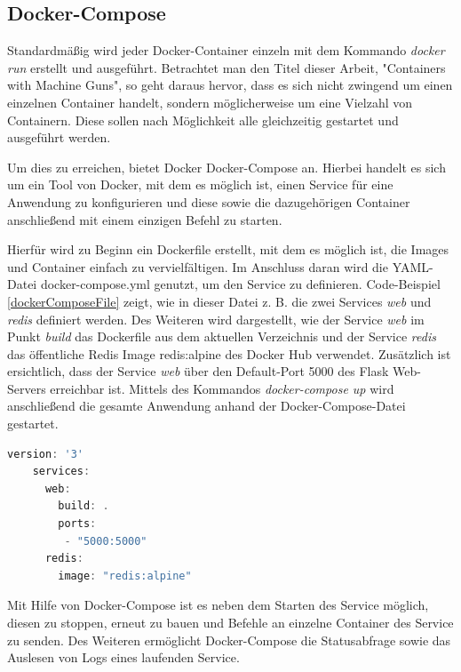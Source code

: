 \subsection{Docker-Compose}
\label{ss:dockerCompose}

Standardmäßig wird jeder Docker-Container einzeln mit dem Kommando \textit{docker run} erstellt und ausgeführt.
Betrachtet man den Titel dieser Arbeit, "Containers with Machine Guns", so geht daraus hervor, dass es sich nicht zwingend um einen einzelnen Container handelt, sondern möglicherweise um eine Vielzahl von Containern.
Diese sollen nach Möglichkeit alle gleichzeitig gestartet und ausgeführt werden.

Um dies zu erreichen, bietet Docker Docker-Compose an.
Hierbei handelt es sich um ein Tool von Docker, mit dem es möglich ist, einen Service für eine Anwendung zu konfigurieren und diese sowie die dazugehörigen Container anschließend mit einem einzigen Befehl zu starten.

Hierfür wird zu Beginn ein Dockerfile erstellt, mit dem es möglich ist, die Images und Container einfach zu vervielfältigen.
Im Anschluss daran wird die YAML-Datei docker-compose.yml genutzt, um den Service zu definieren.
Code-Beispiel \ref{dockerComposeFile} zeigt, wie in dieser Datei z. B. die zwei Services \textit{web} und \textit{redis} definiert werden.
Des Weiteren wird dargestellt, wie der Service \textit{web} im Punkt \textit{build} das Dockerfile aus dem aktuellen Verzeichnis und der Service \textit{redis} das öffentliche Redis Image \glqq{}redis:alpine\grqq{} des Docker Hub verwendet.
Zusätzlich ist ersichtlich, dass der Service \textit{web} über den Default-Port 5000 des Flask Web-Servers erreichbar ist.
Mittels des Kommandos \textit{docker-compose up} wird anschließend die gesamte Anwendung anhand der Docker-Compose-Datei gestartet.

\begin{minipage}{\linewidth}
	\begin{lstlisting}[frame=single,caption=Beispiel Docker Compose Datei \cite{Docker:online2}, label=dockerComposeFile, language=Scala]
	version: '3'
	services:
	  web:
	    build: .
	    ports:
	     - "5000:5000"
	  redis:
	    image: "redis:alpine"
	\end{lstlisting}
\end{minipage}

Mit Hilfe von Docker-Compose ist es neben dem Starten des Service möglich, diesen zu stoppen, erneut zu bauen und Befehle an einzelne Container des Service zu senden.
Des Weiteren ermöglicht Docker-Compose die Statusabfrage sowie das Auslesen von Logs eines laufenden Service.

